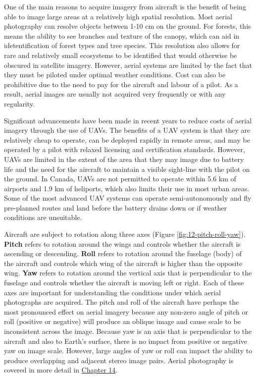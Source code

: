 \documentclass[
]{book}
\begin{document}
One of the main reasons to acquire imagery from aircraft is the benefit of being able to image large areas at a relatively high spatial resolution. Most aerial photography can resolve objects between 1-10 cm on the ground. For forests, this means the ability to see branches and texture of the canopy, which can aid in idetentification of forest types and tree species. This resolution also allows for rare and relatively small ecosystems to be identified that would otherwise be obscured in satellite imagery. However, aerial systems are limited by the fact that they must be piloted under optimal weather conditions. Cost can also be prohibitive due to the need to pay for the aircraft and labour of a pilot. As a result, aerial images are usually not acquired very frequently or with any regularity.

Significant advancements have been made in recent years to reduce costs of aerial imagery through the use of UAVs. The benefits of a UAV system is that they are relatively cheap to operate, can be deployed rapidly in remote areas, and may be operated by a pilot with relaxed licensing and certification standards. However, UAVs are limited in the extent of the area that they may image due to battery life and the need for the aircraft to maintain a visible sight-line with the pilot on the ground. In Canada, UAVs are not permitted to operate within 5.6 km of airports and 1.9 km of heliports, which also limits their use in most urban areas. Some of the most advanced UAV systems can operate semi-autonomously and fly pre-planned routes and land before the battery drains down or if weather conditions are unsuitable.

Aircraft are subject to rotation along three axes (Figure \ref{fig:12-pitch-roll-yaw}). \textbf{Pitch} refers to rotation around the wings and controls whether the aircraft is ascending or descending. \textbf{Roll} refers to rotation around the fuselage (body) of the aircraft and controls which wing of the aircraft is higher than the opposite wing. \textbf{Yaw} refers to rotation around the vertical axis that is perpendicular to the fuselage and controls whether the aircraft is moving left or right. Each of these axes are important for understanding the conditions under which aerial photographs are acquired. The pitch and roll of the aircraft have perhaps the most pronounced effect on aerial imagery because any non-zero angle of pitch or roll (positive or negative) will produce an oblique image and cause scale to be inconsistent across the image. Because yaw is an axis that is perpendicular to the aircraft and also to Earth's surface, there is no impact from positive or negative yaw on image scale. However, large angles of yaw or roll can impact the ability to produce overlapping and adjacent stereo image pairs. Aerial photography is covered in more detail in \href{https://ubc-geomatics-textbook.github.io/geomatics-textbook/image-analysis.html}{Chapter 14}.
\end{document}
